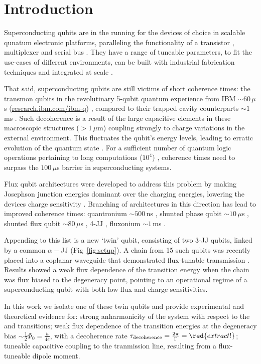 \section{Introduction}
 \noindent Superconducting qubits are in the running for the devices of choice in scalable qunatum electronic platforms, paralleling the functionality of a transistor \cite{Astafiev2010}\cite{hoi2011}, multiplexer \cite{honigl2018} and serial bus \cite{shen2005}. They have a range of tuneable parameters, to fit the use-cases of different environments, can be built with industrial fabrication techniques and integrated at scale \cite{johnson2010}. 
 
 That said, superconducting qubits are still victims of short coherence times: the transmon qubits in the revolutinary 5-qubit quantum experience from IBM $ \sim 60\,\mu $s (\href{http://www.research.ibm.com/ibm-q}{research.ibm.com/ibm-q}) \cite{linke2017}, compared to their trapped cavity counterparts $\sim1\, $ms \cite{monroe1995}. Such decoherence is a result of the large capacitive elements in these macroscopic structures ($>1\,\mu\text{m}$) coupling strongly to charge variations in the external environment. This fluctuates the qubit's energy levels, leading to erratic evolution of the quantum state \cite{devoret2008}. For a sufficient number of quantum logic operations pertaining to long computations ($ 10^{4} $) \cite{orlando1999}, coherence times need to surpass the $ 100\,\mu$s barrier in superconducting systems.
 
 Flux qubit architectures \cite{chiorescu2003}\cite{mooij1999} were developed to address this problem by making Josephson junction energies dominant over the charging energies, lowering the devices charge sensitivity \cite{orlando1999}. Branching of architectures in this direction has lead to improved coherence times: quantronium $\sim500\,$ns \cite{cottet2002} \cite{gu2017}, shunted phase qubit $\sim10\,\mu $s \cite{stern2014} , shunted flux qubit $\sim80\,\mu$s \cite{yan2016} , 4-JJ \cite{qui2016}, fluxonium $\sim1\,$ms \cite{pop2014}. 
 
 Appending to this list is a new `twin' qubit, consisting of two 3-JJ qubits, linked by a common $ \alpha-$JJ (Fig~\ref{fig:setup}). A chain from 15 such qubits was recently placed into a coplanar waveguide that demonstrated flux-tunable transmission \cite{shulga2018}. Results showed a weak flux dependence of the transition energy when the chain was flux biased to the degeneracy point, pointing to an operational regime of a superconducting qubit with both low flux and charge sensitivities.
 
 In this work we isolate one of these twin qubits and provide experimental and theoretical evidence for: strong anharmonicity of the system with respect to the \lra{} and \lra{} transitions; weak flux dependence of the transition energies at the degeneracy bias $\sim \frac{1}{2}\Phi_0 = \frac{h}{4e}$, with a decoherence rate $ \tau_\text{decoherence} = \frac{2\pi}{\Gamma}= \red{extract!} $; tuneable capacitive coupling to the tranmission line, resulting from a flux-tuneable dipole moment.
 
